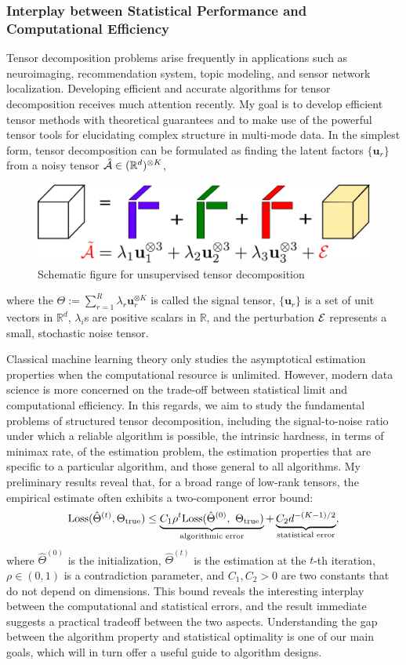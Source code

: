 \documentclass[10pt]{article}
\newcommand*{\KeepStyleUnderBrace}[1]{%
  \mathop{%
    \mathchoice
    {\underbrace{\displaystyle#1}}%
    {\underbrace{\textstyle#1}}%
    {\underbrace{\scriptstyle#1}}%
    {\underbrace{\scriptscriptstyle#1}}%
  }\limits
}
\theoremstyle{definition}
\theoremstyle{definition}
\theoremstyle{definition}
\begin{document}
\subsubsection{Interplay between Statistical Performance and Computational Efficiency}
Tensor decomposition problems arise frequently in applications such as neuroimaging, recommendation system, topic modeling, and sensor network localization. Developing efficient and accurate algorithms for tensor decomposition receives much attention recently. My goal is to develop efficient tensor methods with theoretical guarantees and to make use of the powerful tensor tools for elucidating complex structure in multi-mode data. In the simplest form, tensor decomposition can be formulated as finding the latent factors $\{\mathbf{u}_r\}$ from a noisy tensor $\hat {\mathcal{A}}\in(\mathbb{R}^{d})^{\otimes K}$,
\begin{figure}[H]
\centering
\includegraphics[width=.5\textwidth]{nearly_SOD2.pdf}
\caption{Schematic figure for unsupervised tensor decomposition}\label{fig:3}
\vspace{-.5cm}
\end{figure}
where the $\Theta:=\sum_{r=1}^R \lambda_r \mathbf{u}_r^{\otimes K}$ is called the signal tensor, $\{\mathbf{u}_r\}$ is a set of unit vectors in $\mathbb{R}^d$, $\lambda_i$s are positive scalars in $\mathbb{R}$, and the perturbation $\mathcal{E}$ represents a small, stochastic noise tensor. 

Classical machine learning theory only studies the asymptotical estimation properties when the computational resource is unlimited. However, modern data science is more concerned on the trade-off between statistical limit and computational efficiency. In this regards, we aim to study the fundamental problems of structured tensor decomposition, including the signal-to-noise ratio under which a reliable algorithm is possible, the intrinsic hardness, in terms of minimax rate, of the estimation problem, the estimation properties that are specific to a particular algorithm, and those general to all algorithms. My preliminary results reveal that, for a broad range of low-rank tensors, the empirical estimate often exhibits a two-component error bound:
\[
\text{Loss}(\hat \Theta^{(t)}, \Theta_{\text{true}}) \leq \KeepStyleUnderBrace{C_1 \rho^t\text{Loss}(\hat \Theta^{(0)},\ \Theta_{\text{true}})}_{\text{algorithmic error}}+\KeepStyleUnderBrace{C_2 d^{-(K-1)/2}}_{\text{statistical error}},
\]
where $\hat \Theta^{(0)}$ is the initialization, $\hat \Theta^{(t)}$ is the estimation at the $t$-th iteration, $\rho\in(0,1)$ is a contradiction parameter, and $C_1,C_2>0$ are two constants that do not depend on dimensions. This bound reveals the interesting interplay between the computational and statistical errors, and the result immediate suggests a practical tradeoff between the two aspects. Understanding the gap between the algorithm property and statistical optimality is one of our main goals, which will in turn offer a useful guide to algorithm designs.
\end{document}
